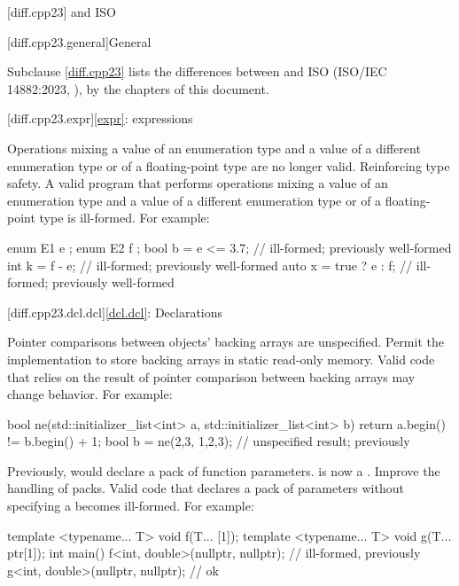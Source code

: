 
[diff.cpp23]{\Cpp{} and ISO \CppXXIII{}}

[diff.cpp23.general]{General}

\pnum
{}%
Subclause \ref{diff.cpp23} lists the differences between \Cpp{} and
ISO \CppXXIII{} (ISO/IEC 14882:2023, ),
by the chapters of this document.

[diff.cpp23.expr]{\ref{expr}: expressions}

\change
Operations mixing a value of an enumeration type and a value of a different
enumeration type or of a floating-point type are no longer valid.
\rationale
Reinforcing type safety.
\effect
A valid \CppXXIII{} program that performs operations mixing a value of an
enumeration type and a value of a different enumeration type or of a
floating-point type is ill-formed.
For example:
\begin{codeblock}
enum E1 { e };
enum E2 { f };
bool b = e <= 3.7;      // ill-formed; previously well-formed
int  k = f - e;         // ill-formed; previously well-formed
auto x = true ? e : f;  // ill-formed; previously well-formed
\end{codeblock}

[diff.cpp23.dcl.dcl]{\ref{dcl.dcl}: Declarations}

\change
Pointer comparisons between  objects' backing arrays
are unspecified.
\rationale
Permit the implementation to store backing arrays in static read-only memory.
\effect
Valid \CppXXIII{} code
that relies on the result of pointer comparison between backing arrays
may change behavior.
For example:
\begin{codeblock}
bool ne(std::initializer_list<int> a, std::initializer_list<int> b) {
  return a.begin() != b.begin() + 1;
}
bool b = ne({2,3}, {1,2,3});    // unspecified result; previously 
\end{codeblock}

\change
Previously,  would declare a pack of function parameters.
 is now a .
\rationale
Improve the handling of packs.
\effect
Valid \CppXXIII{} code that declares a pack of parameters
without specifying a  becomes ill-formed.
For example:
\begin{codeblock}
template <typename... T>
void f(T... [1]);
template <typename... T>
void g(T... ptr[1]);
int main() {
  f<int, double>(nullptr, nullptr);     // ill-formed, previously 
  g<int, double>(nullptr, nullptr);     // ok
}
\end{codeblock}


